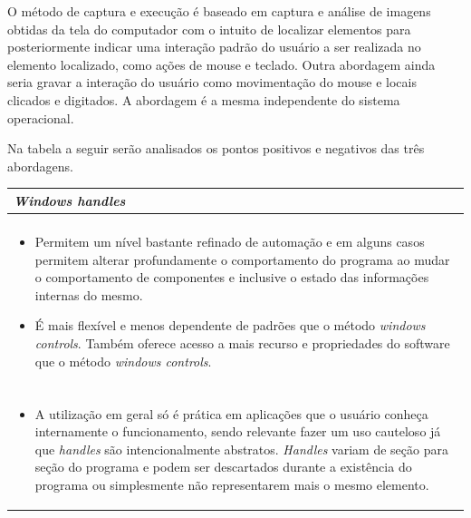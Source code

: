 \documentclass[tg]{mdtufsm}
\begin{document}
                O método de captura e execução é baseado em captura e análise de imagens obtidas da tela do computador com o intuito de localizar elementos para posteriormente indicar uma interação padrão do usuário a ser realizada no elemento localizado, como ações de mouse e teclado. Outra abordagem ainda seria gravar a interação do usuário como movimentação do mouse e locais clicados e digitados. A abordagem é a mesma independente do sistema operacional.

                Na tabela a seguir serão analisados os pontos positivos e negativos das três abordagens.

                \bigskip
                {\centering
                \begin{tabularx}{\textwidth}{|*{1}{>{\centering\arraybackslash}X}|}
                    \hline
                    \emph{Windows handles} \\
                    \hline
                    {\bf prós:} \\
                    \begin{itemize}
                        \item Permitem um nível bastante refinado de automação e em alguns casos permitem alterar profundamente o comportamento do programa ao mudar o comportamento de componentes e inclusive o estado das informações internas do mesmo.
                        \item É mais flexível e menos dependente de padrões que o método \emph{windows controls}. Também oferece acesso a mais recurso e propriedades do software que o método \emph{windows controls}.
                    \end{itemize}
                    \\ {\bf contras:} \\
                    \begin{itemize}
                        \item A utilização em geral só é prática em aplicações que o usuário conheça internamente o funcionamento, sendo relevante fazer um uso cauteloso já que \emph{handles} são intencionalmente abstratos. \emph{Handles} variam de seção para seção do programa e podem ser descartados durante a existência do programa ou simplesmente não representarem mais o mesmo elemento.
                    \end{itemize}
                    \\ \hline
                \end{tabularx}

}
\end{document}

